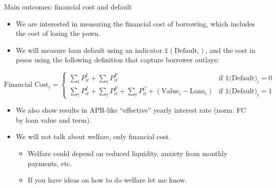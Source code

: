 \documentclass[9pt, aspectratio=169]{beamer}
\begin{document}
\begin{frame}{Main outcomes: financial cost and default}
\label{fc_outcome}
\begin{itemize}
    \item We are interested in measuring the financial cost of borrowing, which includes the cost of losing the pawn.
    \vfill \item We will measure loan default using an indicator $\mathds{1}(\text{Default}_i)$, and the cost in pesos using the following definition that capture borrower outlays:    
\end{itemize}

\vspace{-.1in}

\begin{equation*}
  \text{Financial Cost}_i =
  \begin{cases}
    \sum_t P^{I}_{it} + \sum_t P^{F}_{it}   & \text{if } \mathds{1}\text{(Default)}_i=0\\
     \sum_t P^{I}_{it} + \sum_t P^{F}_{it} + \sum_t P^{C}_{it} + (\text{Value}_i - \text{Loan}_i) & \text{if } \mathds{1}\text{(Default)}_i=1 
  \end{cases}
\end{equation*}


\vfill \begin{itemize}
    \item We also show results in APR-like ``effective'' yearly interest rate (norm. FC by loan value and term).
\end{itemize}


   \vspace{.1in}
\begin{itemize}
    \item We \alert{will not talk about welfare}, only financial cost.
    \begin{itemize}
        \item Welfare could depend on reduced liquidity, anxiety from monthly payments, etc.
        \item If you have ideas on how to do welfare let me know.
    \end{itemize}
\end{itemize}
\end{frame}
\end{document}
